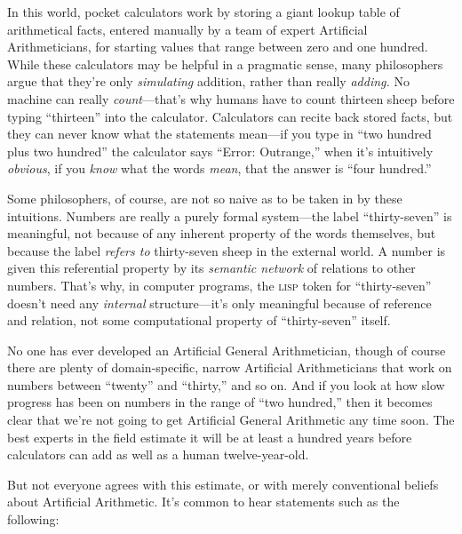  In this world, pocket calculators work by storing a giant lookup
table of arithmetical facts, entered manually by a team of expert
Artificial Arithmeticians, for starting values that range between zero
and one hundred. While these calculators may be helpful in a pragmatic
sense, many philosophers argue that they're only
\textit{simulating} addition, rather than really \textit{adding.} No
machine can really \textit{count}{}---that's why humans
have to count thirteen sheep before typing
``thirteen'' into the calculator.
Calculators can recite back stored facts, but they can never know what
the statements mean---if you type in ``two hundred
plus two hundred'' the calculator says
``Error: Outrange,'' when
it's intuitively \textit{obvious}, if you \textit{know}
what the words \textit{mean}, that the answer is
``four hundred.''


 Some philosophers, of course, are not so naive as to be taken in
by these intuitions. Numbers are really a purely formal system---the
label ``thirty-seven'' is
meaningful, not because of any inherent property of the words
themselves, but because the label \textit{refers to} thirty-seven sheep
in the external world. A number is given this referential property by
its \textit{semantic network} of relations to other numbers.
That's why, in computer programs, the \textsc{lisp} token for
``thirty-seven''
doesn't need any \textit{internal}
structure---it's only meaningful because of reference
and relation, not some computational property of
``thirty-seven'' itself.


 No one has ever developed an Artificial General Arithmetician,
though of course there are plenty of domain-specific, narrow Artificial
Arithmeticians that work on numbers between
``twenty'' and
``thirty,'' and so on. And if you
look at how slow progress has been on numbers in the range of
``two hundred,'' then it becomes
clear that we're not going to get Artificial General
Arithmetic any time soon. The best experts in the field estimate it
will be at least a hundred years before calculators can add as well as
a human twelve-year-old.


 But not everyone agrees with this estimate, or with merely
conventional beliefs about Artificial Arithmetic. It's
common to hear statements such as the following:

